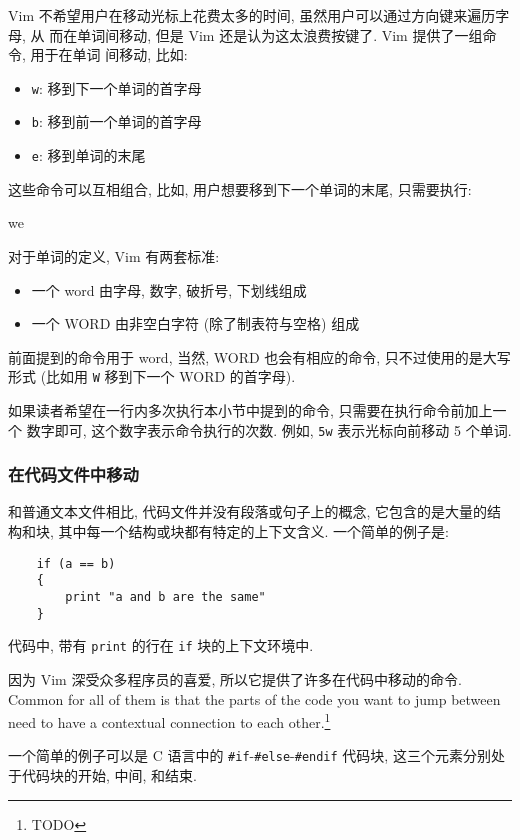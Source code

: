 Vim 不希望用户在移动光标上花费太多的时间, 虽然用户可以通过方向键来遍历字母, 从
而在单词间移动, 但是 Vim 还是认为这太浪费按键了. Vim 提供了一组命令, 用于在单词
间移动, 比如:
\begin{itemize}
    \item \texttt{w}: 移到下一个单词的首字母
    \item \texttt{b}: 移到前一个单词的首字母
    \item \texttt{e}: 移到单词的末尾
\end{itemize}
这些命令可以互相组合, 比如, 用户想要移到下一个单词的末尾, 只需要执行:
\begin{vimcmd}
we
\end{vimcmd}

对于单词的定义, Vim 有两套标准:
\begin{itemize}
    \item 一个 word 由字母, 数字, 破折号, 下划线组成
    \item 一个 WORD 由非空白字符 (除了制表符与空格) 组成
\end{itemize}
前面提到的命令用于 word, 当然, WORD 也会有相应的命令, 只不过使用的是大写形式
(比如用 \texttt{W} 移到下一个 WORD 的首字母).
\begin{warning}
    如果读者希望在一行内多次执行本小节中提到的命令, 只需要在执行命令前加上一个
    数字即可, 这个数字表示命令执行的次数. 例如, \texttt{5w} 表示光标向前移动 5
    个单词.
\end{warning}

\subsubsection{在代码文件中移动}
\label{subsubsec:moving_in_a_code_file}

和普通文本文件相比, 代码文件并没有段落或句子上的概念, 它包含的是大量的结构和块,
其中每一个结构或块都有特定的上下文含义. 一个简单的例子是:
\begin{verbatim}
    if (a == b)
    {
        print "a and b are the same"
    }
\end{verbatim}
代码中, 带有 \texttt{print} 的行在 \texttt{if} 块的上下文环境中.

因为 Vim 深受众多程序员的喜爱, 所以它提供了许多在代码中移动的命令. Common for
all of them is that the parts of the code you want to jump between need to have
a contextual connection to each other.\footnote{TODO}

一个简单的例子可以是 C 语言中的 \texttt{\#if}-\texttt{\#else}-\texttt{\#endif}
代码块, 这三个元素分别处于代码块的开始, 中间, 和结束.

